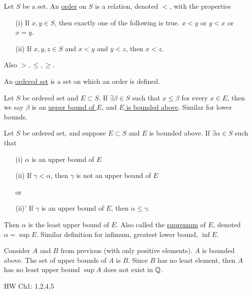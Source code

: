 \documentclass[]{article}
\begin{document}
\begin{definition}
	Let $S$ be a set. An \ul{order} on $S$ is a relation, denoted $<$, with the properties
	\begin{enumerate}
		\item[(i)] If $x,y\in S$, then exactly one of the following is true. $x<y$ or $y<x$ or $x=y$.
		\item[(ii)] If $x,y,z\in S$ and $x<y$ and $y<z$, then $x<z$.
	\end{enumerate}
	Also $>,\leq,\geq$.
\end{definition}

\begin{definition}
	An \ul{ordered set} is a set on which an order is defined.
\end{definition}

\begin{definition}
	Let $S$ be ordered set and $E\subset S$. If $\exists\beta\in S$ such that $x\leq \beta$ for every $x\in E$, then we say $\beta$ is an \ul{upper bound of $E$}, and \ul{$E$ is bounded above}. Similar for lower bounds.
\end{definition}

\begin{definition}
	Let $S$ be ordered set, and suppose $E\subset S$ and $E$ is bounded above.
	If $\exists\alpha\in S$ such that
	\begin{enumerate}
		\item[(i)] $\alpha$ is an upper bound of $E$
		\item[(ii)] If $\gamma<\alpha$, then $\gamma$ is not an upper bound of $E$

			or

		\item[(ii)'] If $\gamma$ is an upper bound of $E$, then $\alpha\leq\gamma$.
	\end{enumerate}
	Then $\alpha$ is the least upper bound of $E$.
	Also called the \ul{supremum} of $E$, denoted $\alpha=\sup E$.
	Similar definition for infimum, greatest lower bound, $\inf E$.
\end{definition}

\begin{example}
	Consider $A$ and $B$ from previous (with only positive elements). $A$ is bounded above.
	The set of upper bounds of $A$ is $B$.
	Since $B$ has no least element, then $A$ has no least upper bound $\sup A$ does not exist in $\mathbb{Q}$.
\end{example}

HW Ch1: 1,2,4,5
\end{document}
